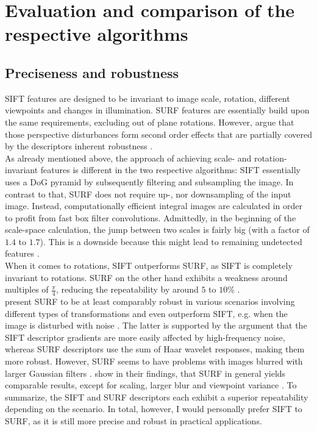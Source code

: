 \documentclass[a4paper, 11pt]{article} %
\begin{document}
\section{Evaluation and comparison of the respective algorithms}
\label{sec:comparison}
\subsection{Preciseness and robustness}
SIFT features are designed to be invariant to image scale, rotation, different viewpoints and changes in illumination. SURF features are essentially build upon the same requirements, excluding out of plane rotations. However, \citeauthor{bay2008speeded} argue that those perspective disturbances form second order effects that are partially covered by the descriptors inherent robustness \cite{bay2008speeded}. \\
As already mentioned above, the approach of achieving scale- and rotation-invariant features is different in the two respective algorithms: SIFT essentially uses a DoG pyramid by subsequently filtering and subsampling the image. In contrast to that, SURF does not require up-, nor downsampling of the input image. Instead, computationally efficient integral images are calculated in order to profit from fast box filter convolutions. Admittedly, in the beginning of the scale-space calculation, the jump between two scales is fairly big (with a factor of $1.4$ to $1.7$). This is a downside because this might lead to remaining undetected features \cite{bay2008speeded}. \\
When it comes to rotations, SIFT outperforms SURF, as SIFT is completely invariant to rotations. SURF on the other hand exhibits a weakness around multiples of $\frac{\pi}{4}$, reducing the repeatability by around $5$ to $10$\% \cite{bay2008speeded}.\\
\citeauthor{bay2008speeded} present SURF to be at least comparably robust in various scenarios involving different types of transformations and even outperform SIFT, e.g. when the image is disturbed with noise \cite{bay2008speeded}. The latter is supported by the argument that the SIFT descriptor gradients are more easily affected by high-frequency noise, whereas SURF descriptors use the sum of Haar wavelet responses, making them more robust. However, SURF seems to have problems with images blurred with larger Gaussian filters \cite{khan2011sift}. \citeauthor{khan2011sift} show in their findings, that SURF in general yields comparable results, except for scaling, larger blur and viewpoint variance \cite{khan2011sift}. To summarize, the SIFT and SURF descriptors each exhibit a superior repeatability depending on the scenario. In total, however, I would personally prefer SIFT to SURF, as it is still more precise and robust in practical applications. 
\end{document}
